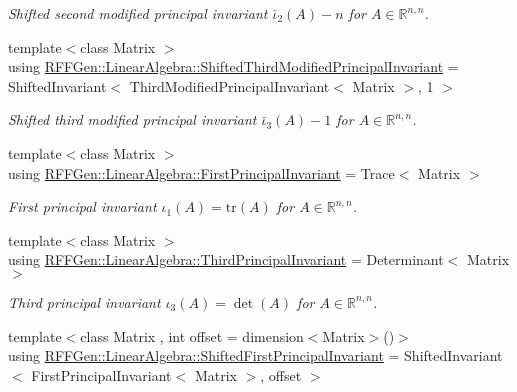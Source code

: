\begin{DoxyCompactItemize}
\begin{DoxyCompactList}\small\item\em Shifted second modified principal invariant $ \bar\iota_2(A) - n $ for $ A\in\mathbb{R}^{n,n} $. \end{DoxyCompactList}\item 
\hypertarget{group__LinearAlgebraGroup_ga915154ab519db597193b2dcdf2e0368c}{{\footnotesize template$<$class Matrix $>$ }\\using \hyperlink{group__LinearAlgebraGroup_ga915154ab519db597193b2dcdf2e0368c}{R\-F\-F\-Gen\-::\-Linear\-Algebra\-::\-Shifted\-Third\-Modified\-Principal\-Invariant} = Shifted\-Invariant$<$ Third\-Modified\-Principal\-Invariant$<$ Matrix $>$, 1 $>$}\label{group__LinearAlgebraGroup_ga915154ab519db597193b2dcdf2e0368c}

\begin{DoxyCompactList}\small\item\em Shifted third modified principal invariant $ \bar\iota_3(A) - 1 $ for $ A\in\mathbb{R}^{n,n} $. \end{DoxyCompactList}\item 
\hypertarget{group__LinearAlgebraGroup_ga00013718baca174259e8699c7a5d9dc4}{{\footnotesize template$<$class Matrix $>$ }\\using \hyperlink{group__LinearAlgebraGroup_ga00013718baca174259e8699c7a5d9dc4}{R\-F\-F\-Gen\-::\-Linear\-Algebra\-::\-First\-Principal\-Invariant} = Trace$<$ Matrix $>$}\label{group__LinearAlgebraGroup_ga00013718baca174259e8699c7a5d9dc4}

\begin{DoxyCompactList}\small\item\em First principal invariant $ \iota_1(A)=\mathrm{tr}(A) $ for $A\in\mathbb{R}^{n,n}$. \end{DoxyCompactList}\item 
\hypertarget{group__LinearAlgebraGroup_ga3ace6e6d227a8bcaec150749f56e4886}{{\footnotesize template$<$class Matrix $>$ }\\using \hyperlink{group__LinearAlgebraGroup_ga3ace6e6d227a8bcaec150749f56e4886}{R\-F\-F\-Gen\-::\-Linear\-Algebra\-::\-Third\-Principal\-Invariant} = Determinant$<$ Matrix $>$}\label{group__LinearAlgebraGroup_ga3ace6e6d227a8bcaec150749f56e4886}

\begin{DoxyCompactList}\small\item\em Third principal invariant $ \iota_3(A)=\det(A) $ for $A\in\mathbb{R}^{n,n}$. \end{DoxyCompactList}\item 
\hypertarget{group__LinearAlgebraGroup_ga7f9e376f62d3a241e6c2a7ffbbbcde11}{{\footnotesize template$<$class Matrix , int offset = dimension$<$\-Matrix$>$()$>$ }\\using \hyperlink{group__LinearAlgebraGroup_ga7f9e376f62d3a241e6c2a7ffbbbcde11}{R\-F\-F\-Gen\-::\-Linear\-Algebra\-::\-Shifted\-First\-Principal\-Invariant} = Shifted\-Invariant$<$ First\-Principal\-Invariant$<$ Matrix $>$, offset $>$}\label{group__LinearAlgebraGroup_ga7f9e376f62d3a241e6c2a7ffbbbcde11}


\end{DoxyCompactItemize}

